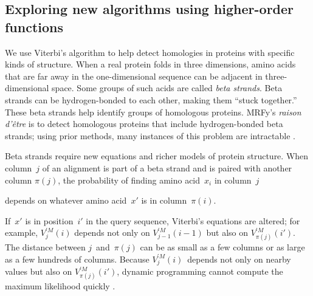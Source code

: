 \documentclass[]{jfp1}
\newcommand\pairedwith[1]{{\pi(#1)}}
\newcommand\seclabel[1]{\label{sec:#1}}
\let\cite\citep
\begin{document}
\subsection{Exploring new algorithms using higher-order functions}

\seclabel{hofs}
\seclabel{mrfy}

We use Viterbi's algorithm to help detect
homologies in proteins with specific kinds of structure.
When a real protein folds in three dimensions, 
amino acids 
that are far away in the one-dimensional sequence can be
adjacent in three-dimensional space.
Some groups of such acids are called \emph{beta strands}.
Beta strands
can be hydrogen-bonded to each other,
making them ``stuck together.''
These beta strands help identify groups of homologous
proteins.
MRFy's \emph{raison d'\^etre} is to detect homologous proteins that
include hydrogen-bonded beta 
strands; using prior methods, many instances of this problem are
intractable \cite{daniels:thesis}. 

Beta strands require new equations and
richer models of protein structure.
When column~$j$ of an alignment is part of a beta strand and is paired
with another column  $\pairedwith j$,
the probability of finding amino acid~$x_i$ in column~$j$ 
\iffalse
depends on the amino acid~$x'$ in column~${\pairedwith i}$.
\else
depends on whatever amino acid~$x'$  is in column~${\pairedwith i}$.
\fi
If~$x'$ is in position~$i'$ in the query sequence, Viterbi's
equations are altered; for example,
$V_{j}^{\prime M}(i)$ depends not only on
$V_{j-1}^{\prime M}(i-1)$ but also on
$V_{\pairedwith j}^{\prime M}(i')$.
The distance between $j$~and~$\pairedwith j$ can be as small as a few
columns or as large as a few hundreds of columns.
Because $V_j^{\prime M}(i)$~depends not only on nearby values but also on
$V_{\pairedwith j}^{\prime M}(i')$,
dynamic programming cannot compute the maximum likelihood quickly 
\cite{Menke:2010ti,Daniels:2012}.
\end{document}
